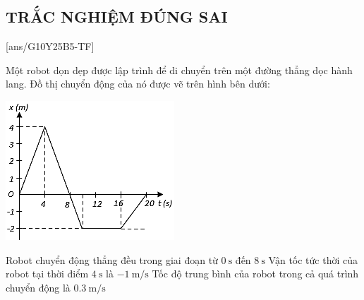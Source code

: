 \subsection{TRẮC NGHIỆM ĐÚNG SAI}
\setcounter{ex}{0}
[ans/G10Y25B5-TF]
\begin{ex}
	Một robot dọn dẹp được lập trình để di chuyển trên một đường thẳng dọc hành lang. Đồ thị chuyển động của nó được vẽ trên hình bên dưới:
	\begin{center}
		\includegraphics[scale=1]{figs/G10Y25B5-16}
	\end{center}
	{Robot chuyển động thẳng đều trong giai đoạn từ $\SI{0}{\second}$ đến $\SI{8}{\second}$}
	{\True Vận tốc tức thời của robot tại thời điểm $\SI{4}{\second}$ là $\SI{-1}{\meter/\second}$}
	{Tốc độ trung bình của robot trong cả quá trình chuyển động là $\SI{0,3}{\meter/\second}$}
\end{ex}

